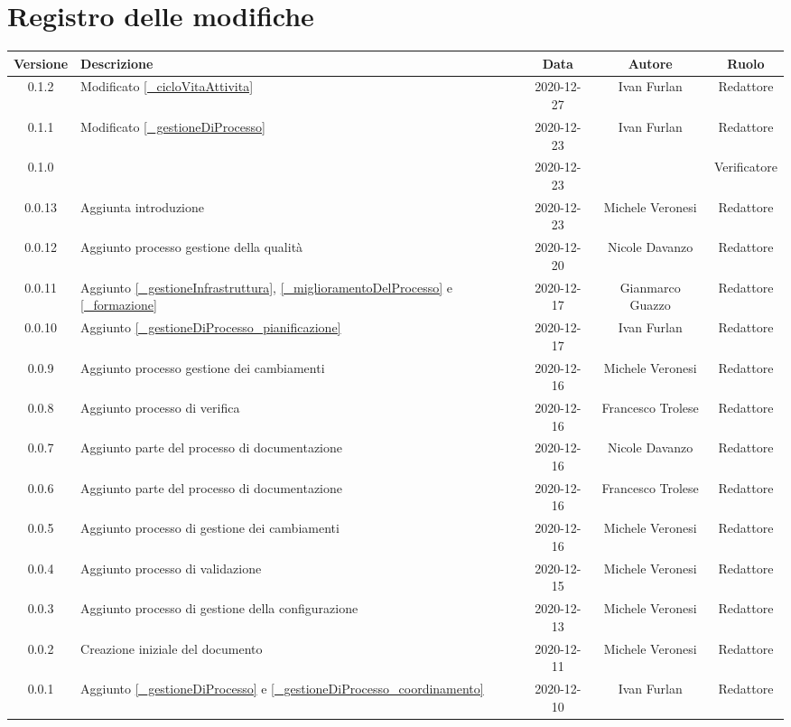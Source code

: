 \section*{Registro delle modifiche}

\begin{center}
	\begin{longtable}{|c|p{5cm}|c|c|c|}
	\hline
	\rowcolor{lighter-grayer}
	\textbf{Versione} & \textbf{Descrizione} & \textbf{Data} & \textbf{Autore} & \textbf{Ruolo} \\
	\hline
	\endfirsthead


	\hline
	0.1.2 & Modificato \ref{_cicloVitaAttivita} & 2020-12-27& Ivan Furlan & Redattore \\
	0.1.1 & Modificato \ref{_gestioneDiProcesso} & 2020-12-23 & Ivan Furlan & Redattore \\
	0.1.0 &  & 2020-12-23 &  & Verificatore \\
	0.0.13 & Aggiunta introduzione & 2020-12-23 & Michele Veronesi & Redattore \\
	0.0.12 & Aggiunto processo gestione della qualità & 2020-12-20 & Nicole Davanzo & Redattore \\
	0.0.11 & Aggiunto \ref{_gestioneInfrastruttura}, \ref{_miglioramentoDelProcesso} e \ref{_formazione} & 2020-12-17 & Gianmarco Guazzo & Redattore \\
	0.0.10 & Aggiunto \ref{_gestioneDiProcesso_pianificazione} & 2020-12-17 & Ivan Furlan & Redattore \\
	0.0.9 & Aggiunto processo gestione dei cambiamenti & 2020-12-16 & Michele Veronesi & Redattore \\
	0.0.8 & Aggiunto processo di verifica & 2020-12-16 & Francesco Trolese & Redattore \\
	0.0.7 & Aggiunto parte del processo di documentazione & 2020-12-16 & Nicole Davanzo & Redattore \\
	0.0.6 & Aggiunto parte del processo di documentazione & 2020-12-16 & Francesco Trolese & Redattore \\
	0.0.5 & Aggiunto processo di gestione dei cambiamenti & 2020-12-16 & Michele Veronesi & Redattore \\
	0.0.4 & Aggiunto processo di validazione & 2020-12-15 & Michele Veronesi & Redattore \\
	0.0.3 & Aggiunto processo di gestione della configurazione & 2020-12-13 & Michele Veronesi & Redattore \\
	0.0.2 & Creazione iniziale del documento & 2020-12-11 & Michele Veronesi & Redattore \\
	0.0.1 & Aggiunto \ref{_gestioneDiProcesso} e \ref{_gestioneDiProcesso_coordinamento} & 2020-12-10 & Ivan Furlan & Redattore \\

	\hline

	\end{longtable}
\end{center}
